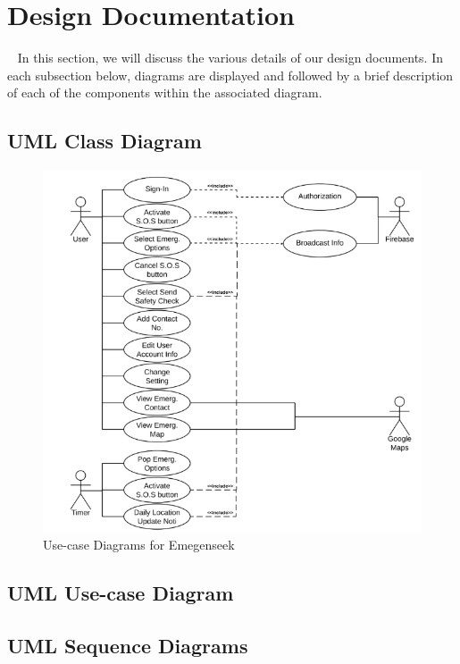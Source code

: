 \documentclass[10pt, a4paper]{article}
\begin{document}
\section{Design Documentation}
\par ~ In this section, we will discuss the various details of our design documents. In each subsection below, diagrams are displayed and followed by a brief description of each of the components within the associated diagram.

\subsection{UML Class Diagram}
\begin{figure}[H]
  \centerline{
  	\includegraphics[scale=.8]{diagrams/use-case.png}
  }  
  \caption{Use-case Diagrams for Emegenseek}\label{fig:mobile3}
\end{figure}

\subsection{UML Use-case Diagram}
\subsection{UML Sequence Diagrams}
\end{document}
